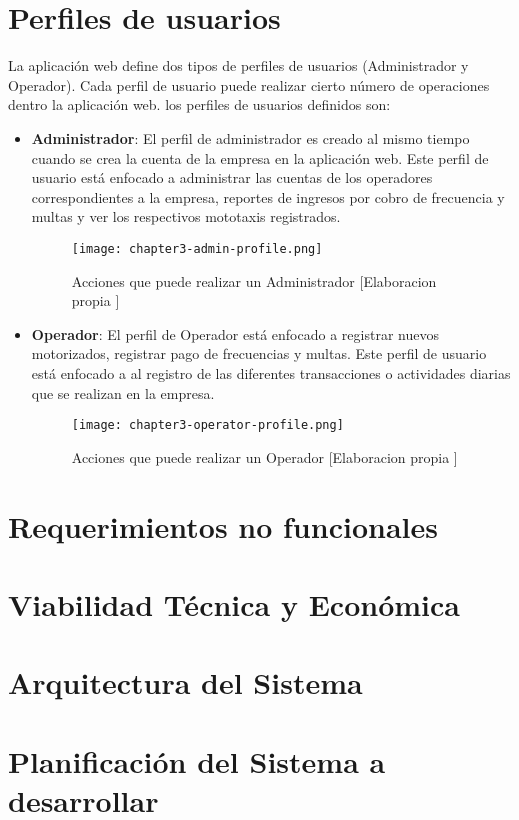 \section{Perfiles de usuarios}
\noindent La aplicación web define dos tipos de perfiles de usuarios (Administrador y Operador). Cada perfil de  usuario puede realizar cierto número de operaciones dentro la aplicación web.
\noindent los perfiles de usuarios definidos son:
\begin{itemize}
\item \textbf{Administrador}: El perfil de administrador es creado al mismo tiempo cuando se crea la cuenta de la empresa en la aplicación web. Este perfil de usuario está enfocado a administrar las cuentas de los operadores correspondientes a la empresa, reportes de ingresos por cobro de frecuencia y multas y ver los respectivos mototaxis registrados.
\begin{figure}[ht]
  \centering
  \texttt{[image: chapter3-admin-profile.png]}
  \caption{Acciones que puede realizar un Administrador [Elaboracion propia ]}  
\end{figure}
\item \textbf{Operador}: El perfil de Operador está enfocado a registrar nuevos motorizados, registrar pago de frecuencias y multas. Este perfil de usuario está enfocado a al registro de las diferentes transacciones o actividades diarias que se realizan en la empresa.
\begin{figure}[ht]
  \centering
  \texttt{[image: chapter3-operator-profile.png]}
  \caption{Acciones que puede realizar un Operador [Elaboracion propia ]}  
\end{figure}
\end{itemize}
\section{Requerimientos no funcionales}
\section{Viabilidad Técnica y Económica}
\section{Arquitectura del Sistema}
\section{Planificación del Sistema a desarrollar}

